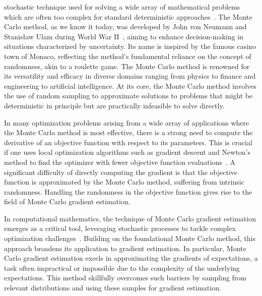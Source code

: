 \documentclass[12pt]{amsart}
\begin{document}
stochastic technique used for solving a wide array of mathematical problems which are often too complex for standard deterministic approaches~\cite{metropolis1949monte,rubinstein2016simulation}. 
The Monte Carlo method, as we know it today, was developed by John von Neumann and Stanis{\l}aw Ulam during World War II~\cite{von1947statistical,metropolis1949monte,eckhardt1987stan,metropolis1987beginning}, aiming to enhance decision-making in situations characterized by uncertainty. Its name is inspired by the famous casino town of Monaco, reflecting the method's fundamental reliance on the concept of randomness, akin to a roulette game. The Monte Carlo method is renowned for its versatility and efficacy in diverse domains ranging from physics to finance and engineering to artificial intelligence. At its core, the Monte Carlo method involves the use of random sampling to approximate solutions to problems that might be deterministic in principle but are practically infeasible to solve directly. 


In many optimization problems arising from a wide array of applications where the Monte Carlo method is most effective, there is a strong need to compute the derivative of an objective function with respect to its parameters. This is crucial if one uses local optimization algorithms such as gradient descent and Newton's method to find the optimizer with fewer objective function evaluations~\cite{nocedal2006numerical}. A significant difficulty of directly computing the gradient is that the objective function is approximated by the Monte Carlo method, suffering from intrinsic randomness. Handling the randomness in the objective function gives rise to the field of Monte Carlo gradient estimation.

In computational mathematics, the technique of Monte Carlo gradient estimation emerges as a critical tool, leveraging stochastic processes to tackle complex optimization challenges~\cite{glasserman2013monte,mohamed2019monte,glynn1990likelihood,rubinstein1986score}. Building on the foundational Monte Carlo method, this approach broadens its application to gradient estimation. In particular, Monte Carlo gradient estimation excels in approximating the gradients of expectations, a task often impractical or impossible due to the complexity of the underlying expectations. This method skillfully overcomes such barriers by sampling from relevant distributions and using these samples for gradient estimation.
\end{document}
